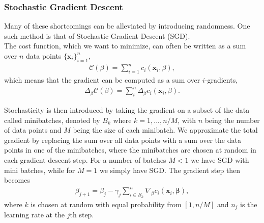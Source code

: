 \documentclass[english,notitlepage,reprint,nofootinbib]{revtex4-2}  %
\begin{document}
\subsubsection*{Stochastic Gradient Descent}%
Many of these shortcomings can be alleviated by introducing randomness. One such method is that of Stochastic Gradient Descent (SGD). 
\vspace{3mm}
\\ 
The cost function, which we want to minimize, can often be written as a sum over $n$ data points $\{\boldsymbol{x}_i\}^n_{i=1}$, 
\begin{align}
    \mathcal{C}(\beta) = \sum\limits_{i=1}^n c_i (\boldsymbol{x}_i, \beta), \nonumber 
\end{align}
which means that the gradient can be computed as a sum over $i$-gradients, 
\begin{align}\label{eq: costfunc_SGD}
    \Delta_\beta \mathcal{C}(\beta) = \sum\limits_{i}^n \Delta_\beta c_i  (\boldsymbol{x}_i, \beta). 
\end{align}

Stochasticity is then introduced by taking the gradient on a subset of the data called minibatches, denoted by $B_k$ where $k=1, ..., n/M$, with $n$ being the number of data points and $M$ being the size of each minibatch. We approximate the total gradient by replacing the sum over all data points with a sum over the data points in one of the minibatches, 
where the minibatches are chosen at random in each gradient descent step. For a number of batches $M<1$ we have SGD with mini batches, while for $M=1$ we simply have SGD. 
The gradient step then becomes 
\begin{align}
    \beta_{j+1} 
    = \beta_j - \gamma_j \sum_{i \in B_k}^n \nabla_\beta c_i(\mathbf{x}_i,
    \mathbf{\beta}),  \nonumber
\end{align}
where $k$ is chosen at random with equal probability from $[1, n/M]$ and $n_j$ is the learning rate at the $j$th step. 

\end{document}
